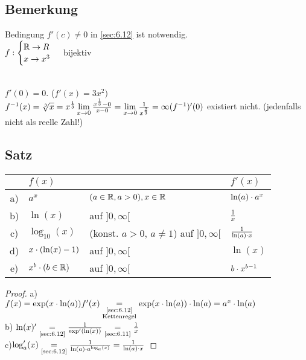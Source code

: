 \subsection{Bemerkung}
Bedingung $f'(c) \ne 0$ in \ref{sec:6.12} ist notwendig.\\
$f : \begin{cases}
\mathbb{R} \to R\\
x \to x^3
\end{cases}$ bijektiv \qquad
{}\\
$f'(0) = 0.$ \hfill ($f'(x) =3x^2)$\\
$f^{-1}(x) = \sqrt[3]{x} = x^{\frac{1}{3}}\\
\lim\limits_{x \to 0} \frac{x^{\frac{1}{3}} - 0}{x - 0} = \lim\limits_{x \to 0} \frac{1}{x^{\frac{2}{3}}} = \infty\\
(f^{-1})'(0)$ existiert nicht. (jedenfalls nicht als reelle Zahl!)
\subsection[Satz]{Satz}\label{sec:6.14}
\begin{tabular}{cll|l}
	& $f(x)$ & & $f'(x)$\\
	\hline
	a) & $a^x$ & $(a \in \mathbb{R}, a> 0), x\in \mathbb{R}$ & $\ln(a) \cdot a^x$\\
	b) & $\ln(x)$ & auf $]0,\infty[$ & $\frac{1}{x}$\\
	c) & $\log_{10}(x)$ & (konst. $a > 0,\, a \ne 1$) auf $]0,\infty[$ & $\frac{1}{\ln(a) \cdot x}$\\
	d) & $x \cdot (\ln(x) -1 )$ & auf $]0,\infty[$ & $\ln(x)$\\
	e) & $x^b \cdot (b \in \mathbb{R})$& auf $]0,\infty[ $ & $b \cdot x^{b-1}$ 
\end{tabular}
\begin{proof}
	a)\\
	$f(x) = \exp(x \cdot \ln(a))\\
	f'(x) \underset{\substack
		{\text{\ref{sec:6.12}}\\\text{Kettenregel}}}{=} \exp(x \cdot \ln(a)) \cdot \ln(a) = a^x \cdot \ln(a)$\\
	b) $\ln(x)'  \underset{\text{\ref{sec:6.12}}}{=} \frac{1}{\exp'(\ln(x))} \underset{\text{\ref{sec:6.11}}}{=} \frac{1}{x}$\\
	c)$ \log'_a(x) \underset{\text{\ref{sec:6.12}}}{=} \frac{1}{\ln(a) \cdot a^{\log_a(x)}} = \frac{1}{\ln(a) \cdot x}$
\end{proof}
